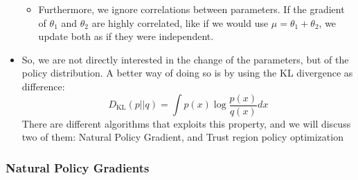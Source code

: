\begin{itemize}
\begin{itemize}
		\item Furthermore, we ignore correlations between parameters. If the gradient of $\theta_1$ and $\theta_2$ are highly correlated, like if we would use $\mu=\theta_1+\theta_2$, we update both as if they were independent.
	\end{itemize}
	\item So, we are not directly interested in the change of the parameters, but of the policy distribution. A better way of doing so is by using the KL divergence as difference:
	$$D_{\text{KL}}(p||q)=\int p(x)\log\frac{p(x)}{q(x)}dx$$
	There are different algorithms that exploits this property, and we will discuss two of them: Natural Policy Gradient, and Trust region policy optimization
\end{itemize}
\subsubsection{Natural Policy Gradients}
